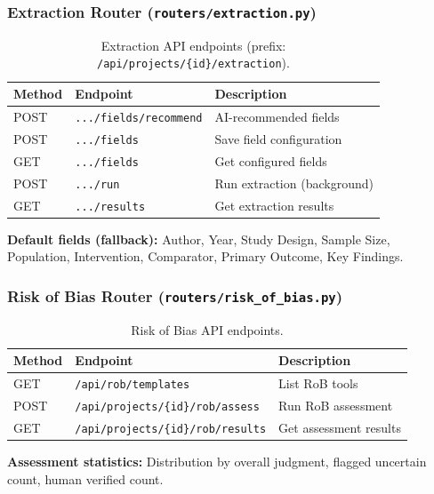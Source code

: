 \documentclass[11pt,a4paper]{article}
\begin{document}
\subsubsection{Extraction Router (\texttt{routers/extraction.py})}

\begin{table}[H]
\centering\small
\begin{tabular}{llp{4cm}}
\toprule
\textbf{Method} & \textbf{Endpoint} & \textbf{Description} \\
\midrule
POST & \texttt{.../fields/recommend} & AI-recommended fields \\
POST & \texttt{.../fields} & Save field configuration \\
GET & \texttt{.../fields} & Get configured fields \\
POST & \texttt{.../run} & Run extraction (background) \\
GET & \texttt{.../results} & Get extraction results \\
\bottomrule
\end{tabular}
\caption{Extraction API endpoints (prefix: \texttt{/api/projects/\{id\}/extraction}).}
\end{table}

\textbf{Default fields (fallback):} Author, Year, Study Design, Sample Size, Population, Intervention, Comparator, Primary Outcome, Key Findings.

\subsubsection{Risk of Bias Router (\texttt{routers/risk\_of\_bias.py})}

\begin{table}[H]
\centering\small
\begin{tabular}{llp{5cm}}
\toprule
\textbf{Method} & \textbf{Endpoint} & \textbf{Description} \\
\midrule
GET & \texttt{/api/rob/templates} & List RoB tools \\
POST & \texttt{/api/projects/\{id\}/rob/assess} & Run RoB assessment \\
GET & \texttt{/api/projects/\{id\}/rob/results} & Get assessment results \\
\bottomrule
\end{tabular}
\caption{Risk of Bias API endpoints.}
\end{table}

\textbf{Assessment statistics:} Distribution by overall judgment, flagged uncertain count, human verified count.
\end{document}
